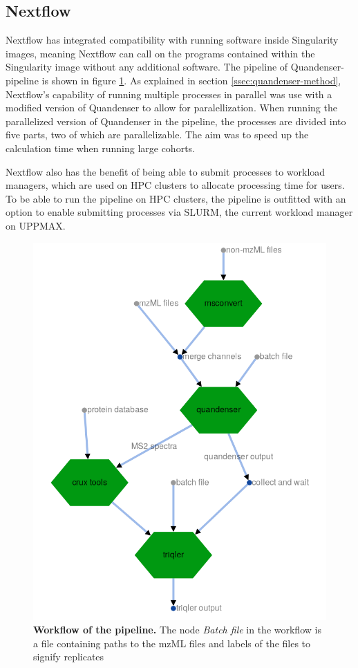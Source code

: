 \subsection{Nextflow}
Nextflow has integrated compatibility with running software inside Singularity images, meaning Nextflow can call on the programs contained within the Singularity image without any additional software. The pipeline of Quandenser-pipeline is shown in figure \ref{fig:workflow}. As explained in section \ref{ssec:quandenser-method}, Nextflow's capability of running multiple processes in parallel was use with a modified version of Quandenser to allow for paralellization. When running the parallelized version of Quandenser in the pipeline, the processes are divided into five parts, two of which are parallelizable. The aim was to speed up the calculation time when running large cohorts.

Nextflow also has the benefit of being able to submit processes to workload managers, which are used on HPC clusters to allocate processing time for users. To be able to run the pipeline on HPC clusters, the pipeline is outfitted with an option to enable submitting processes via SLURM, the current workload manager on UPPMAX.

\begin{figure}[H]
  \begin{center}
  \includegraphics[width=0.5\linewidth]{pictures/workflow.png}
  \caption{\textbf{Workflow of the pipeline.} The node \textit{Batch file} in the workflow is a file containing paths to the mzML files and labels of the files to signify replicates}
  \label{fig:workflow}
  \end{center}
\end{figure}

